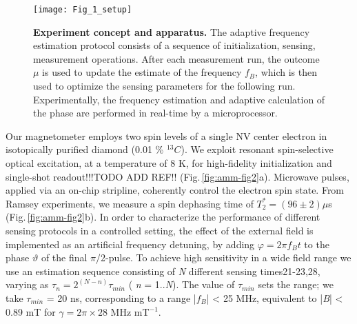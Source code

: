 \begin{figure*}
	\centering
	\texttt{[image: Fig\_1\_setup]}
	\caption{\label{fig:amm-fig1} \textbf{Experiment concept and apparatus.} The adaptive frequency estimation protocol consists of a sequence of initialization, sensing, measurement operations. After each measurement run, the outcome $\mu$ is used to update the estimate of the frequency $f_B$, which is then used to optimize the sensing parameters for the following run. Experimentally, the frequency estimation and adaptive calculation of the phase are performed in real-time by a microprocessor.}
\end{figure*}

Our magnetometer employs two spin levels of a single NV center electron in isotopically purified diamond (0.01 \% $^{13}C$). We exploit resonant spin-selective optical excitation, at a temperature of 8 K, for high-fidelity initialization and single-shot readout!!!TODO ADD REF!! (Fig.\,\ref{fig:amm-fig2}a). Microwave pulses, applied via an on-chip stripline, coherently control the electron spin state. From Ramsey experiments, we measure a spin dephasing time of $T_2^* = (96 \pm 2) \mu$s (Fig.\,\ref{fig:amm-fig2}b). In order to characterize the performance of different sensing protocols in a controlled setting, the effect of the external field is implemented as an artificial frequency detuning, by adding $\varphi = 2 \pi f_B t$ to the phase $\vartheta$  of the final $\pi$/2-pulse. To achieve high sensitivity in a wide field range we use an estimation sequence consisting of \textit{N} different sensing times21-23,28, varying as $\tau_n = 2^{(N-n)} \tau_{min}$ ( \textit{n} = 1..\textit{N}). The value of $\tau_{min}$ sets the range; we take $\tau_{min}$ = 20 ns, corresponding to a range |$f_B$| < 25  MHz, equivalent to |\textit{B}| < 0.89 mT for $\gamma = 2 \pi \times 28$ MHz mT$^{-1}$.

